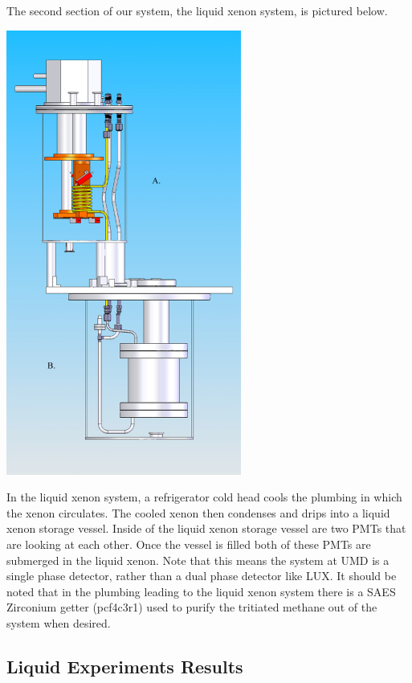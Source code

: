 \documentclass[a4paper,12pt]{article}
\begin{document}
The second section of our system, the liquid xenon system, is pictured below.

\begin{center}
\includegraphics[scale=0.5]{cryo.png}
\end{center}

In the liquid xenon system, a refrigerator cold head cools the plumbing in which the xenon circulates.  The cooled xenon then condenses and drips into a liquid xenon storage vessel.  Inside of the liquid xenon storage vessel are two PMTs that are looking at each other.  Once the vessel is filled both of these PMTs are submerged in the liquid xenon.  Note that this means the system at UMD is a single phase detector, rather than a dual phase detector like LUX.  It should be noted that in the plumbing leading to the liquid xenon system there is a SAES Zirconium getter (pcf4c3r1) used to purify the tritiated methane out of the system when desired.

\subsection{Liquid Experiments Results}
\end{document}
